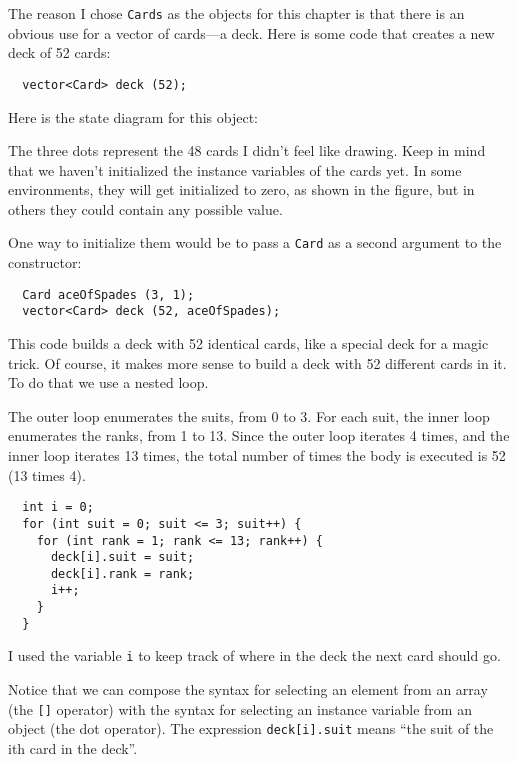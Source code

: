 The reason I chose {\tt Cards} as the objects for this chapter is that
there is an obvious use for a vector of cards---a deck.  Here is some
code that creates a new deck of 52 cards:

\begin{lstlisting}
  vector<Card> deck (52);
\end{lstlisting}
%
Here is the state diagram for this object:


\vspace{0.1in}
\centerline{}
\vspace{0.1in}

The three dots represent the 48 cards I didn't feel like
drawing.  Keep in mind that we haven't initialized the instance
variables of the cards yet.  In some environments, they will get
initialized to zero, as shown in the figure, but in others they
could contain any possible value.

One way to initialize them would be to pass a {\tt Card} as
a second argument to the constructor:

\begin{lstlisting}
  Card aceOfSpades (3, 1);
  vector<Card> deck (52, aceOfSpades);
\end{lstlisting}
%
This code builds a deck with 52 identical cards, like
a special deck for a magic trick.  Of course,
it makes more sense to build a deck with 52 different cards
in it.  To do that we use a nested loop.


The outer loop enumerates the suits, from 0 to 3.  For
each suit, the inner loop enumerates the ranks, from 1
to 13.  Since the outer loop iterates 4 times, and
the inner loop iterates 13 times, the total number of times
the body is executed is 52 (13 times 4).

\begin{lstlisting}
  int i = 0;
  for (int suit = 0; suit <= 3; suit++) {
    for (int rank = 1; rank <= 13; rank++) {
      deck[i].suit = suit;
      deck[i].rank = rank;
      i++;
    }
  }
\end{lstlisting}
%
I used the variable {\tt i} to keep track of where in the
deck the next card should go.


Notice that we can compose the syntax for selecting an element
from an array (the {\tt []} operator) with the syntax for
selecting an instance variable from an object (the dot
operator).  The expression {\tt deck[i].suit} means 
``the suit of the ith card in the deck''.

